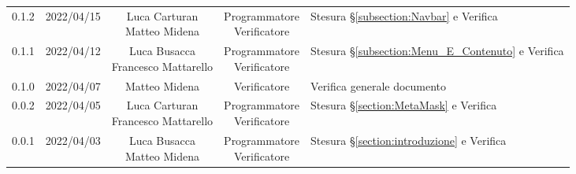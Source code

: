 \begin{center}
\begin{longtable}[c]{c | c | c | c | p{5cm}}
		0.1.2 & 2022/04/15 & \Shortunderstack{Luca Carturan\\Matteo Midena} & \Shortunderstack{Programmatore\\Verificatore} & Stesura §\ref{subsection:Navbar} e Verifica\\
		0.1.1 & 2022/04/12 & \Shortunderstack{Luca Busacca\\Francesco Mattarello} & \Shortunderstack{Programmatore\\Verificatore} & Stesura §\ref{subsection:Menu_E_Contenuto} e Verifica\\
		0.1.0 & 2022/04/07 & Matteo Midena & Verificatore & Verifica generale documento\\
		0.0.2 & 2022/04/05 & \Shortunderstack{Luca Carturan\\Francesco Mattarello} & \Shortunderstack{Programmatore\\Verificatore} & Stesura §\ref{section:MetaMask} e Verifica\\
		0.0.1 & 2022/04/03 & \Shortunderstack{Luca Busacca\\Matteo Midena} & \Shortunderstack{Programmatore\\Verificatore} & Stesura §\ref{section:introduzione} e Verifica\\

	\end{longtable}
\end{center}
